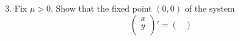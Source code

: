 \documentclass[../psets.tex]{subfiles}
\begin{document}
\begin{enumerate}
\begin{enumerate}
        \setcounter{enumii}{2}
        \item Fix $\mu>0$. Show that the fixed point $(0,0)$ of the system
        \begin{equation*}
            \begin{pmatrix}
                x\\
                y\\
            \end{pmatrix}'
            =
            \begin{pmatrix}

\end{pmatrix}
\end{equation*}
\end{enumerate}
\end{enumerate}
\end{document}
